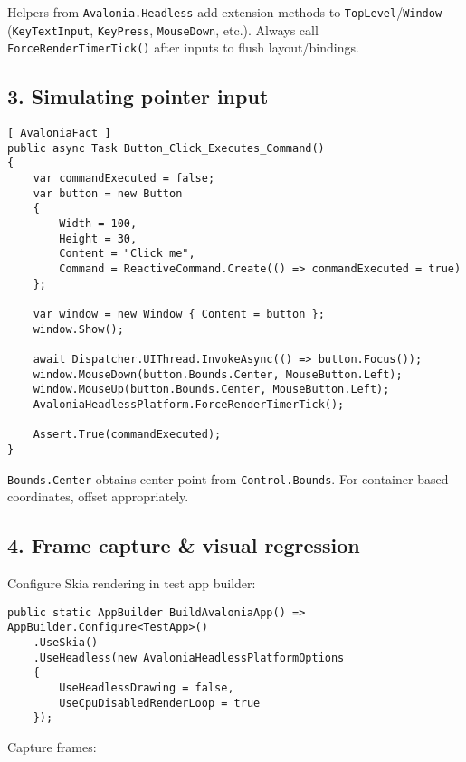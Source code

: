 Helpers from \passthrough{\lstinline!Avalonia.Headless!} add extension
methods to
\passthrough{\lstinline!TopLevel!}/\passthrough{\lstinline!Window!}
(\passthrough{\lstinline!KeyTextInput!},
\passthrough{\lstinline!KeyPress!}, \passthrough{\lstinline!MouseDown!},
etc.). Always call \passthrough{\lstinline!ForceRenderTimerTick()!}
after inputs to flush layout/bindings.

\subsection{3. Simulating pointer input}\label{simulating-pointer-input}

\begin{lstlisting}
[ AvaloniaFact ]
public async Task Button_Click_Executes_Command()
{
    var commandExecuted = false;
    var button = new Button
    {
        Width = 100,
        Height = 30,
        Content = "Click me",
        Command = ReactiveCommand.Create(() => commandExecuted = true)
    };

    var window = new Window { Content = button };
    window.Show();

    await Dispatcher.UIThread.InvokeAsync(() => button.Focus());
    window.MouseDown(button.Bounds.Center, MouseButton.Left);
    window.MouseUp(button.Bounds.Center, MouseButton.Left);
    AvaloniaHeadlessPlatform.ForceRenderTimerTick();

    Assert.True(commandExecuted);
}
\end{lstlisting}

\passthrough{\lstinline!Bounds.Center!} obtains center point from
\passthrough{\lstinline!Control.Bounds!}. For container-based
coordinates, offset appropriately.

\subsection{4. Frame capture \& visual
regression}\label{frame-capture-visual-regression}

Configure Skia rendering in test app builder:

\begin{lstlisting}
public static AppBuilder BuildAvaloniaApp() => AppBuilder.Configure<TestApp>()
    .UseSkia()
    .UseHeadless(new AvaloniaHeadlessPlatformOptions
    {
        UseHeadlessDrawing = false,
        UseCpuDisabledRenderLoop = true
    });
\end{lstlisting}

Capture frames:

